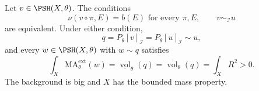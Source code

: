 \begin{proposition}\label{countable-divisorial:positive-mass}
Let $v\in\PSH(X,\theta)$. The conditions
\[
 \nu(v\circ\pi,E)=b(E)\text{ for every }\pi,E,
 \qquad v\sim_{\mathcal I}u
\]
are equivalent. Under either condition,
\[
 q=P_\theta[v]_{\mathcal I}=P_\theta[u]_{\mathcal I}\sim u,
\]
and every $w\in\PSH(X,\theta)$ with $w\sim q$ satisfies
\begin{equation}\label{eq:countable-divisorial-positive-mass}
 \int_X\mathrm{MA}^{\mathrm{ext}}_\theta(w)
 =\underline{\operatorname{vol}}_\theta(q)
 =\overline{\operatorname{vol}}_\theta(q)
 =\int_XR^2>0.
\end{equation}
The background is big and $X$ has the bounded mass property.
\end{proposition}
